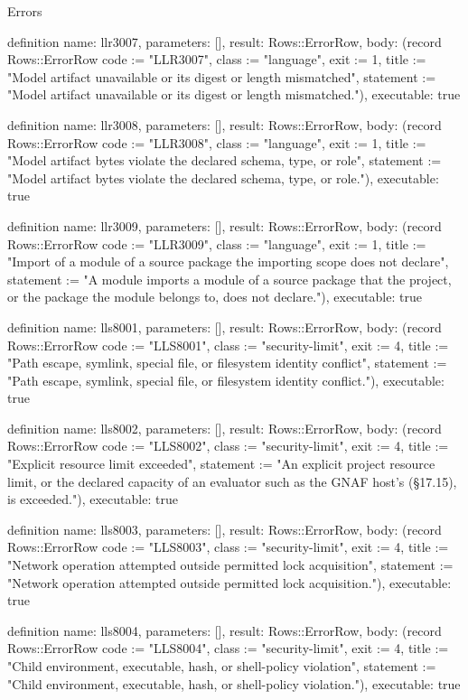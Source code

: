\begin{lexlean}{Errors}
\begin{semanticmodule}
definition{
  name: llr3007,
  parameters: [],
  result: Rows::ErrorRow,
  body: (record Rows::ErrorRow {code := "LLR3007", class := "language", exit := 1, title := "Model artifact unavailable or its digest or length mismatched", statement := "Model artifact unavailable or its digest or length mismatched."}),
  executable: true
}

definition{
  name: llr3008,
  parameters: [],
  result: Rows::ErrorRow,
  body: (record Rows::ErrorRow {code := "LLR3008", class := "language", exit := 1, title := "Model artifact bytes violate the declared schema, type, or role", statement := "Model artifact bytes violate the declared schema, type, or role."}),
  executable: true
}

definition{
  name: llr3009,
  parameters: [],
  result: Rows::ErrorRow,
  body: (record Rows::ErrorRow {code := "LLR3009", class := "language", exit := 1, title := "Import of a module of a source package the importing scope does not declare", statement := "A module imports a module of a source package that the project, or the package the module belongs to, does not declare."}),
  executable: true
}

definition{
  name: lls8001,
  parameters: [],
  result: Rows::ErrorRow,
  body: (record Rows::ErrorRow {code := "LLS8001", class := "security-limit", exit := 4, title := "Path escape, symlink, special file, or filesystem identity conflict", statement := "Path escape, symlink, special file, or filesystem identity conflict."}),
  executable: true
}

definition{
  name: lls8002,
  parameters: [],
  result: Rows::ErrorRow,
  body: (record Rows::ErrorRow {code := "LLS8002", class := "security-limit", exit := 4, title := "Explicit resource limit exceeded", statement := "An explicit project resource limit, or the declared capacity of an evaluator such as the GNAF host's (§17.15), is exceeded."}),
  executable: true
}

definition{
  name: lls8003,
  parameters: [],
  result: Rows::ErrorRow,
  body: (record Rows::ErrorRow {code := "LLS8003", class := "security-limit", exit := 4, title := "Network operation attempted outside permitted lock acquisition", statement := "Network operation attempted outside permitted lock acquisition."}),
  executable: true
}

definition{
  name: lls8004,
  parameters: [],
  result: Rows::ErrorRow,
  body: (record Rows::ErrorRow {code := "LLS8004", class := "security-limit", exit := 4, title := "Child environment, executable, hash, or shell-policy violation", statement := "Child environment, executable, hash, or shell-policy violation."}),
  executable: true
}


\end{semanticmodule}
\end{lexlean}

